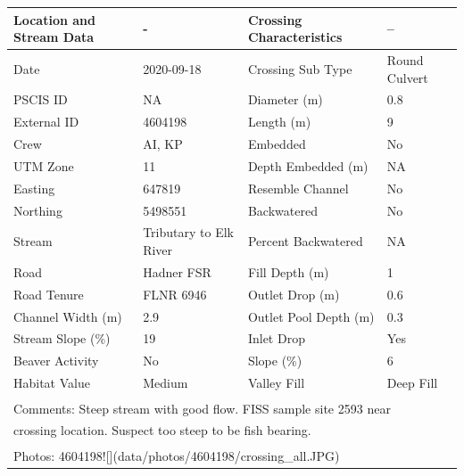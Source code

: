 \documentclass[
]{book}
\begin{document}
\begin{tabular}{llll}
\toprule
Location and Stream Data & - & Crossing Characteristics & --\\
\midrule
Date & 2020-09-18 & Crossing Sub Type & Round Culvert\\
PSCIS ID & NA & Diameter (m) & 0.8\\
External ID & 4604198 & Length (m) & 9\\
Crew & AI, KP & Embedded & No\\
UTM Zone & 11 & Depth Embedded (m) & NA\\
\addlinespace
Easting & 647819 & Resemble Channel & No\\
Northing & 5498551 & Backwatered & No\\
Stream & Tributary to Elk River & Percent Backwatered & NA\\
Road & Hadner FSR & Fill Depth (m) & 1\\
Road Tenure & FLNR 6946 & Outlet Drop (m) & 0.6\\
\addlinespace
Channel Width (m) & 2.9 & Outlet Pool Depth (m) & 0.3\\
Stream Slope (\%) & 19 & Inlet Drop & Yes\\
Beaver Activity & No & Slope (\%) & 6\\
Habitat Value & Medium & Valley Fill & Deep Fill\\
\bottomrule
\multicolumn{4}{l}{\textsuperscript{} Comments: Steep stream with good flow. FISS sample site 2593 near}\\
\multicolumn{4}{l}{crossing location. Suspect too steep to be fish bearing.}\\
\multicolumn{4}{l}{\textsuperscript{} Photos: 4604198![](data/photos/4604198/crossing\_all.JPG)}\\
\end{tabular}
\end{document}
